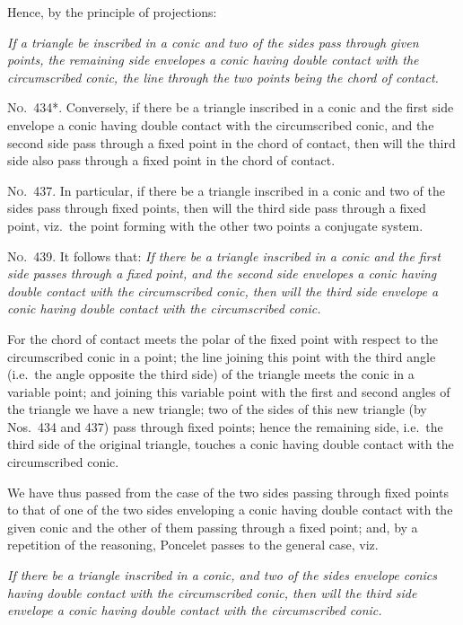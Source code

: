 \documentclass[11pt,a4paper]{book}
\begin{document}
Hence, by the principle of projections:

\textit{If a triangle be inscribed in a conic and two of the sides pass through given points, the remaining side envelopes a conic having double contact with the circumscribed conic, the line through the two points being the chord of contact.}

\textsc{No.~434*.} Conversely, if there be a triangle inscribed in a conic and the first side envelope a conic having double contact with the circumscribed conic, and the second side pass through a fixed point in the chord of contact, then will the third side also pass through a fixed point in the chord of contact.

\textsc{No.~437.} In particular, if there be a triangle inscribed in a conic and two of the sides pass through fixed points, then will the third side pass through a fixed point, viz.\ the point forming with the other two points a conjugate system.

\textsc{No.~439.} It follows that: \textit{If there be a triangle inscribed in a conic and the first side passes through a fixed point, and the second side envelopes a conic having double contact with the circumscribed conic, then will the third side envelope a conic having double contact with the circumscribed conic.}

For the chord of contact meets the polar of the fixed point with respect to the circumscribed conic in a point; the line joining this point with the third angle (i.e.\ the angle opposite the third side) of the triangle meets the conic in a variable point; and joining this variable point with the first and second angles of the triangle we have a new triangle; two of the sides of this new triangle (by Nos.~434 and 437) pass through fixed points; hence the remaining side, i.e.\ the third side of the original triangle, touches a conic having double contact with the circumscribed conic.

We have thus passed from the case of the two sides passing through fixed points to that of one of the two sides enveloping a conic having double contact with the given conic and the other of them passing through a fixed point; and, by a repetition of the reasoning, Poncelet passes to the general case, viz.

\textit{If there be a triangle inscribed in a conic, and two of the sides envelope conics having double contact with the circumscribed conic, then will the third side envelope a conic having double contact with the circumscribed conic.}
\end{document}
